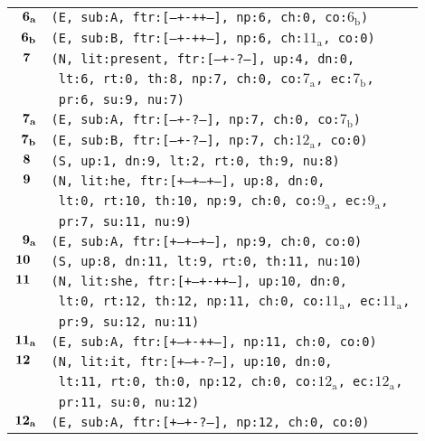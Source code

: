 \documentclass{article}
\begin{document}
\begin{minipage}{\textwidth}
{\begin{tabular}{|r|l|}
    ${\textbf{\textrm{6}}_{\textbf{\textrm{a}}}}$ & \texttt{\texttt{(E,~sub:A,~ftr:[---+-++--],~np:6,~ch:0,~co:${\textrm{6}_{\textrm{b}}}$)}} \\
    ${\textbf{\textrm{6}}_{\textbf{\textrm{b}}}}$ & \texttt{\texttt{(E,~sub:B,~ftr:[---+-++--],~np:6,~ch:${\textrm{11}_{\textrm{a}}}$,~co:0)}} \\
    ${\textbf{\textrm{7}}_{\phantom{z}}}$ & \texttt{\texttt{(N,~lit:present,~ftr:[---+-?---],~up:4,~dn:0,}} \\
    & \texttt{\texttt{~lt:6,~rt:0,~th:8,~np:7,~ch:0,~co:${\textrm{7}_{\textrm{a}}}$,~ec:${\textrm{7}_{\textrm{b}}}$,}} \\
    & \texttt{\texttt{~pr:6,~su:9,~nu:7)}} \\
    ${\textbf{\textrm{7}}_{\textbf{\textrm{a}}}}$ & \texttt{\texttt{(E,~sub:A,~ftr:[---+-?---],~np:7,~ch:0,~co:${\textrm{7}_{\textrm{b}}}$)}} \\
    ${\textbf{\textrm{7}}_{\textbf{\textrm{b}}}}$ & \texttt{\texttt{(E,~sub:B,~ftr:[---+-?---],~np:7,~ch:${\textrm{12}_{\textrm{a}}}$,~co:0)}} \\
    ${\textbf{\textrm{8}}_{\phantom{z}}}$ & \texttt{\texttt{(S,~up:1,~dn:9,~lt:2,~rt:0,~th:9,~nu:8)}} \\
    ${\textbf{\textrm{9}}_{\phantom{z}}}$ & \texttt{\texttt{(N,~lit:he,~ftr:[+--+--+--],~up:8,~dn:0,}} \\
    & \texttt{\texttt{~lt:0,~rt:10,~th:10,~np:9,~ch:0,~co:${\textrm{9}_{\textrm{a}}}$,~ec:${\textrm{9}_{\textrm{a}}}$,}} \\
    & \texttt{\texttt{~pr:7,~su:11,~nu:9)}} \\
    ${\textbf{\textrm{9}}_{\textbf{\textrm{a}}}}$ & \texttt{\texttt{(E,~sub:A,~ftr:[+--+--+--],~np:9,~ch:0,~co:0)}} \\
    ${\textbf{\textrm{10}}_{\phantom{z}}}$ & \texttt{\texttt{(S,~up:8,~dn:11,~lt:9,~rt:0,~th:11,~nu:10)}} \\
    ${\textbf{\textrm{11}}_{\phantom{z}}}$ & \texttt{\texttt{(N,~lit:she,~ftr:[+--+-++--],~up:10,~dn:0,}} \\
    & \texttt{\texttt{~lt:0,~rt:12,~th:12,~np:11,~ch:0,~co:${\textrm{11}_{\textrm{a}}}$,~ec:${\textrm{11}_{\textrm{a}}}$,}} \\
    & \texttt{\texttt{~pr:9,~su:12,~nu:11)}} \\
    ${\textbf{\textrm{11}}_{\textbf{\textrm{a}}}}$ & \texttt{\texttt{(E,~sub:A,~ftr:[+--+-++--],~np:11,~ch:0,~co:0)}} \\
    ${\textbf{\textrm{12}}_{\phantom{z}}}$ & \texttt{\texttt{(N,~lit:it,~ftr:[+--+-?---],~up:10,~dn:0,}} \\
    & \texttt{\texttt{~lt:11,~rt:0,~th:0,~np:12,~ch:0,~co:${\textrm{12}_{\textrm{a}}}$,~ec:${\textrm{12}_{\textrm{a}}}$,}} \\
    & \texttt{\texttt{~pr:11,~su:0,~nu:12)}} \\
    ${\textbf{\textrm{12}}_{\textbf{\textrm{a}}}}$ & \texttt{\texttt{(E,~sub:A,~ftr:[+--+-?---],~np:12,~ch:0,~co:0)}} \\
    \hline
  \end{tabular}
  }
\end{minipage}
\bigbreak
\end{document}
